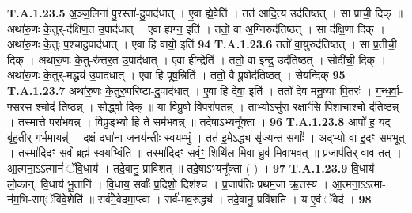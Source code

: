 \documentclass[17pt]{extarticle}
\begin{document}
                  \newline
                                                                  \textbf{ T.A.1.23.5} \newline
                  अ॒ञ्ज॒लिना॑ पु॒रस्ता॑-दु॒पाद॑धात् । ए॒वा ह्ये॒वेति॑ ।  तत॑ आदि॒त्य उद॑तिष्ठत् । सा प्राची॒ दिक् ॥  अथा॑रु॒णः के॒तुर्-द॑क्षिण॒त उ॒पाद॑धात् । ए॒वा ह्यग्न॒ इति॑ । ततो॒ वा अ॒ग्निरुद॑तिष्ठत् । सा द॑क्षि॒णा दिक् । अथा॑रु॒णः के॒तुः प॒श्चादु॒पाद॑धात् । ए॒वा हि वायो॒ इति॑ \textbf{ 94} \newline
                  \newline
                                                                  \textbf{ T.A.1.23.6} \newline
                  ततो॑ वा॒युरुद॑तिष्ठत् । सा प्र॒तीची॒ दिक् ।  अथा॑रु॒णः के॒तु-रु॑त्तर॒त उ॒पाद॑धात् । ए॒वा हीन्द्रेति॑ ।  ततो॒ वा इन्द्र॒ उद॑तिष्ठत् । सोदी॑ची॒ दिक् ।  अथा॑रु॒णः के॒तुर्-मद्ध्य॑ उ॒पाद॑धात् । ए॒वा हि पूष॒न्निति॑ । ततो॒ वै पू॒षोद॑तिष्ठत् । सेयन्दिक् \textbf{ 95} \newline
                  \newline
                                                                  \textbf{ T.A.1.23.7} \newline
                  अथा॑रु॒णः के॒तुरु॒परि॑ष्टा-दु॒पाद॑धात् । ए॒वा हि देवा॒ इति॑ । ततो॑ देव मनु॒ष्याः पि॒तरः॑ । ग॒न्ध॒र्वा॒-फ्स॒रस॒ श्चोद॑-तिष्ठन्न् ।  सोर्द्ध्वा दिक् ॥ या वि॒प्रुषो॑ वि॒परा॑पतन्न् ।  ताभ्योऽसु॑रा॒ रक्षाꣳ॑सि पिशा॒चाश्चो-द॑तिष्ठन्न् । तस्मा॒त्ते परा॑भवन्न् । वि॒प्रुड्भ्यो॒ हि ते सम॑भवन्न् ॥ तदे॒षाऽभ्यनू᳚क्ता । \textbf{ 96} \newline
                  \newline
                                                                  \textbf{ T.A.1.23.8} \newline
                  आपो॑ ह॒ यद् बृ॑ह॒तीर् गर्भ॒मायन्न्॑ । दक्षं॒ दधा॑ना ज॒नय॑न्तीः स्वय॒म्भुं । तत॑ इ॒मेऽद्ध्य-सृ॑ज्यन्त॒ सर्गाः᳚ । अद्भ्यो॒ वा इ॒दꣳ सम॑भूत् ।  तस्मा॑दि॒दꣳ सर्वं॒ ब्रह्म॑ स्वय॒भ्विंति॑ ॥  तस्मा॑दि॒दꣳ सर्वꣳ॒॒ शिथि॑ल-मि॒वा ध्रुव॑-मिवाभवत् ॥ प्र॒जाप॑ति॒र् वाव तत् । आ॒त्मना॒ऽऽत्मानं॑ ॅवि॒धाय॑ ।  तदे॒वानु॒ प्रावि॑शत् ॥ तदे॒षाऽभ्यनू᳚क्ता ( ) । \textbf{ 97} \newline
                  \newline
                                                                  \textbf{ T.A.1.23.9} \newline
                  वि॒धाय॑ लो॒कान्. वि॒धाय॑ भू॒तानि॑ । वि॒धाय॒ सर्वाः᳚ प्र॒दिशो॒ दिश॑श्च । प्र॒जाप॑तिः प्रथम॒जा ऋ॒तस्य॑ । आ॒त्मना॒ऽऽत्मा-न॑म॒भि-सम्ॅवि॑वे॒शेति॑ ॥  सर्व॑मे॒वेदमा॒प्त्वा । सर्व॑-मव॒रुद्ध्य॑ । तदे॒वानु॒ प्रवि॑शति । य ए॒वं ॅवेद॑ । \textbf{ 98} \newline
\end{document}
